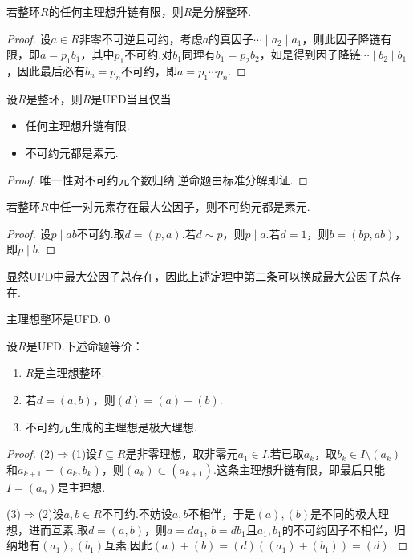 \begin{lemma*}
    若整环$R$的任何主理想升链有限，则$R$是分解整环.
\end{lemma*}
\begin{proof}
    设$a\in R$非零不可逆且可约，考虑$a$的真因子$\cdots\mid a_2\mid a_1$，则此因子降链有限，即$a=p_1b_1$，其中$p_1$不可约.对$b_1$同理有$b_1=p_2b_2$，如是得到因子降链$\cdots\mid b_2\mid b_1$，因此最后必有$b_n=p_n$不可约，即$a=p_1\cdots p_n$.
\end{proof}
\begin{thm}
    设$R$是整环，则$R$是UFD当且仅当
    \begin{itemize}
        \item 任何主理想升链有限.
        \item 不可约元都是素元.
    \end{itemize}
\end{thm}
\begin{proof}
    唯一性对不可约元个数归纳.逆命题由标准分解即证.
\end{proof}
\begin{prop}
    若整环$R$中任一对元素存在最大公因子，则不可约元都是素元.
\end{prop}
\begin{proof}
    设$p\mid ab$不可约.取$d=(p,a)$.若$d\sim p$，则$p\mid a$.若$d=1$，则$b=(bp,ab)$，即$p\mid b$.
\end{proof}

显然UFD中最大公因子总存在，因此上述定理中第二条可以换成最大公因子总存在.
\begin{cor*}
    主理想整环是UFD.\qed
\end{cor*}

\begin{prop}
    设$R$是UFD.下述命题等价：
    \begin{enumerate}
        \item $R$是主理想整环.
        \item 若$d=(a,b)$，则$(d)=(a)+(b)$.
        \item 不可约元生成的主理想是极大理想.
    \end{enumerate}
\end{prop}
\begin{proof}
    \hspace*{5.2pt}(2)$\Rightarrow$(1)设$I\subseteq R$是非零理想，取非零元$a_1\in I$.若已取$a_k$，取$b_k\in I\setminus(a_k)$和$a_{k+1}=(a_k,b_k)$，则$(a_k)\subset(a_{k+1})$.这条主理想升链有限，即最后只能$I=(a_n)$是主理想.

    (3)$\Rightarrow$(2)设$a,b\in R$不可约.不妨设$a,b$不相伴，于是$(a),(b)$是不同的极大理想，进而互素.取$d=(a,b)$，则$a=da_1,\,b=db_1$且$a_1,b_1$的不可约因子不相伴，归纳地有$(a_1),(b_1)$互素.因此$(a)+(b)=(d)((a_1)+(b_1))=(d)$.
\end{proof}

